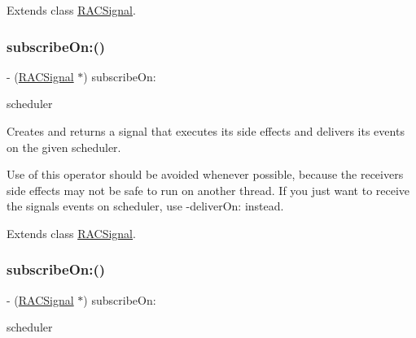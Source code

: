 Extends class \mbox{\hyperlink{interface_r_a_c_signal_a6b8db542f7106880577a943cb8e9da90}{R\+A\+C\+Signal}}.

\mbox{\label{category_r_a_c_signal_07_operations_08_a6b8db542f7106880577a943cb8e9da90}} 
\subsubsection{\texorpdfstring{subscribe\+On\+:()}{subscribeOn:()}\hspace{0.1cm}{\footnotesize\ttfamily [2/3]}}
{\footnotesize\ttfamily -\/ (\mbox{\hyperlink{interface_r_a_c_signal}{R\+A\+C\+Signal}} $\ast$) subscribe\+On\+: \begin{DoxyParamCaption}\item[{(\mbox{\hyperlink{interface_r_a_c_scheduler}{R\+A\+C\+Scheduler}} $\ast$)}]{scheduler }\end{DoxyParamCaption}}

Creates and returns a signal that executes its side effects and delivers its events on the given scheduler.

Use of this operator should be avoided whenever possible, because the receiver\textquotesingle{}s side effects may not be safe to run on another thread. If you just want to receive the signal\textquotesingle{}s events on {\ttfamily scheduler}, use -\/deliver\+On\+: instead. 

Extends class \mbox{\hyperlink{interface_r_a_c_signal_a6b8db542f7106880577a943cb8e9da90}{R\+A\+C\+Signal}}.

\mbox{\label{category_r_a_c_signal_07_operations_08_a6b8db542f7106880577a943cb8e9da90}} 
\subsubsection{\texorpdfstring{subscribe\+On\+:()}{subscribeOn:()}\hspace{0.1cm}{\footnotesize\ttfamily [3/3]}}
{\footnotesize\ttfamily -\/ (\mbox{\hyperlink{interface_r_a_c_signal}{R\+A\+C\+Signal}} $\ast$) subscribe\+On\+: \begin{DoxyParamCaption}\item[{(\mbox{\hyperlink{interface_r_a_c_scheduler}{R\+A\+C\+Scheduler}} $\ast$)}]{scheduler }\end{DoxyParamCaption}}

